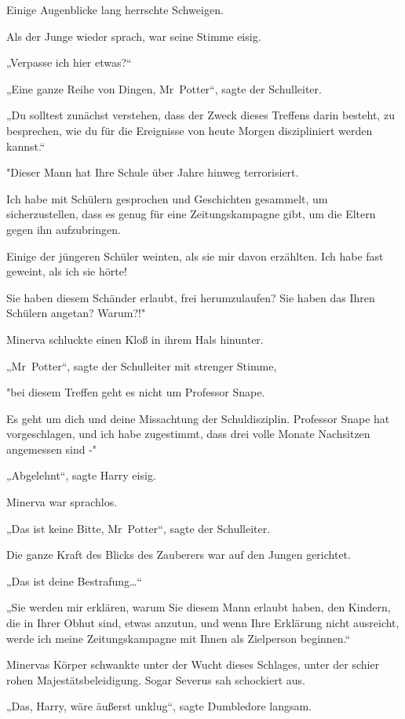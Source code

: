 {Einige Augenblicke lang herrschte Schweigen.

Als der Junge wieder sprach, war seine Stimme eisig.

„Verpasse ich hier etwas?“

„Eine ganze Reihe von Dingen, Mr~Potter“, sagte der Schulleiter.

„Du solltest zunächst verstehen, dass der Zweck dieses Treffens darin besteht, zu besprechen, wie du für die Ereignisse von heute Morgen diszipliniert werden kannst.“

"Dieser Mann hat Ihre Schule über Jahre hinweg terrorisiert.

Ich habe mit Schülern gesprochen und Geschichten gesammelt, um sicherzustellen, dass es genug für eine Zeitungskampagne gibt, um die Eltern gegen ihn aufzubringen.

Einige der jüngeren Schüler weinten, als sie mir davon erzählten. Ich habe fast geweint, als ich sie hörte!

Sie haben diesem Schänder erlaubt, frei herumzulaufen? Sie haben das Ihren Schülern angetan? Warum?!"

Minerva schluckte einen Kloß in ihrem Hals hinunter.

„Mr~Potter“, sagte der Schulleiter mit strenger Stimme,

"bei diesem Treffen geht es nicht um Professor Snape.

Es geht um dich und deine Missachtung der Schuldisziplin. Professor Snape hat vorgeschlagen, und ich habe zugestimmt, dass drei volle Monate Nachsitzen angemessen sind -"

„Abgelehnt“, sagte Harry eisig.

Minerva war sprachlos.

„Das ist keine Bitte, Mr~Potter“, sagte der Schulleiter.

Die ganze Kraft des Blicks des Zauberers war auf den Jungen gerichtet.

„Das ist deine Bestrafung…“

„Sie werden mir erklären, warum Sie diesem Mann erlaubt haben, den Kindern, die in Ihrer Obhut sind, etwas anzutun, und wenn Ihre Erklärung nicht ausreicht, werde ich meine Zeitungskampagne mit Ihnen als Zielperson beginnen.“

Minervas Körper schwankte unter der Wucht dieses Schlages, unter der schier rohen Majestätsbeleidigung. Sogar Severus sah schockiert aus.

„Das, Harry, wäre äußerst unklug“, sagte Dumbledore langsam.

}

